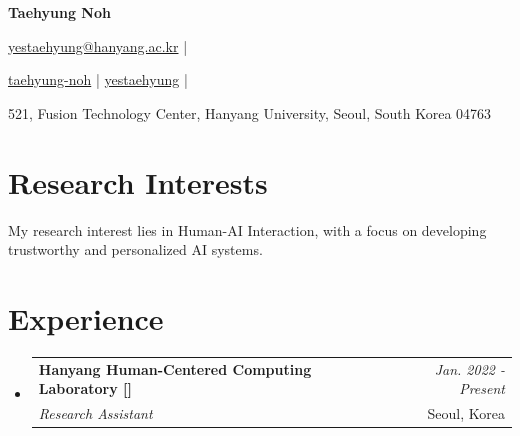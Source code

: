 \documentclass[a4paper,11pt]{article}
\makeatletter
\newcommand{\resumeSubheading}[4]{
\vspace{0.5mm}\item
    \begin{tabular*}{0.98\textwidth}[t]{l@{\extracolsep{\fill}}r}
        \textbf{#1} & \textit{\footnotesize{#4}} \\
        \textit{\footnotesize{#3}} &  \footnotesize{#2}\\
    \end{tabular*}
    \vspace{-2.4mm}
}
\newcommand{\resumeSubHeadingListStart}{\begin{itemize}[leftmargin=*,labelsep=1mm]}
\newcommand{\resumeItemListStart}{\begin{itemize}[leftmargin=*,labelsep=1mm,itemsep=0.5mm]}
\newcommand{\resumeSubHeadingListEnd}{\end{itemize}\vspace{2mm}}
\newcommand{\socialicon}[1]{\raisebox{-0.05em}{\resizebox{!}{1em}{#1}}}
\newcommand{\ieeeicon}[1]{\raisebox{-0.3em}{\resizebox{!}{1.3em}{#1}}}
\makeatother
\begin{document}
\begin{center}
    {\Huge\textbf{Taehyung Noh}}
\end{center}
\vspace{-4mm}

\begin{center}
    \small{
    \href{mailto:yestaehyung@hanyang.ac.kr}{yestaehyung@hanyang.ac.kr} | 
    }
\end{center}
\vspace{-4mm}

\begin{center}
    \small{
    \socialicon{\faLinkedin} \href{https://www.linkedin.com/in/taehyungnoh/}{taehyung-noh} | 
    \socialicon{\faGithub} \href{https://github.com/yestaehyung}{yestaehyung} | 
    }
\end{center}
\vspace{-4mm}
\begin{center}
    \small{521, Fusion Technology Center, Hanyang University, Seoul, South Korea 04763}
\end{center}

\vspace{-4mm}

\section{\textbf{Research Interests}}
\vspace{1mm}
\small{
My research interest lies in Human-AI Interaction, with a focus on developing trustworthy and personalized AI systems.}
\vspace{-1mm}



\section{\textbf{Experience}}
\vspace{-0.4mm}
  \resumeSubHeadingListStart
  \resumeSubheading
      {{Hanyang Human-Centered Computing Laboratory  [\href{http://hcc.hanyang.ac.kr/}{\faIcon{globe}}]}}{Seoul, Korea}
      {Research Assistant}{Jan. 2022 - Present}
  \resumeSubHeadingListEnd
\vspace{-0.4cm}
\end{document}
